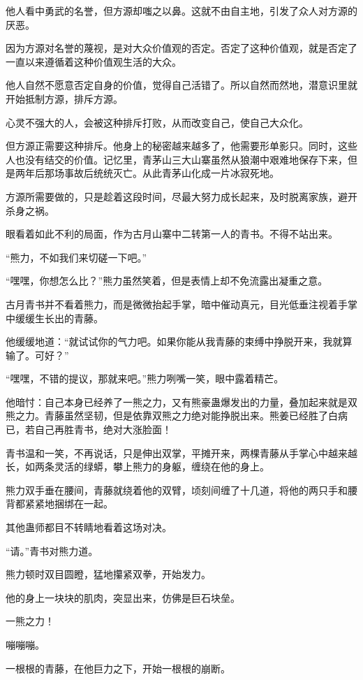 \begin{this_body}
他人看中勇武的名誉，但方源却嗤之以鼻。这就不由自主地，引发了众人对方源的厌恶。

因为方源对名誉的蔑视，是对大众价值观的否定。否定了这种价值观，就是否定了一直以来遵循着这种价值观生活的大众。

他人自然不愿意否定自身的价值，觉得自己活错了。所以自然而然地，潜意识里就开始抵制方源，排斥方源。

心灵不强大的人，会被这种排斥打败，从而改变自己，使自己大众化。

但方源正需要这种排斥。他身上的秘密越来越多了，他需要形单影只。同时，这些人也没有结交的价值。记忆里，青茅山三大山寨虽然从狼潮中艰难地保存下来，但是两年后那场事故后统统灭亡。从此青茅山化成一片冰寂死地。

方源所需要做的，只是趁着这段时间，尽最大努力成长起来，及时脱离家族，避开杀身之祸。

眼看着如此不利的局面，作为古月山寨中二转第一人的青书。不得不站出来。

“熊力，不如我们来切磋一下吧。”

“嘿嘿，你想怎么比？”熊力虽然笑着，但是表情上却不免流露出凝重之意。

古月青书并不看着熊力，而是微微抬起手掌，暗中催动真元，目光低垂注视着手掌中缓缓生长出的青藤。

他缓缓地道：“就试试你的气力吧。如果你能从我青藤的束缚中挣脱开来，我就算输了。可好？”

“嘿嘿，不错的提议，那就来吧。”熊力咧嘴一笑，眼中露着精芒。

他暗忖：自己本身已经养了一熊之力，又有熊豪蛊爆发出的力量，叠加起来就是双熊之力。青藤虽然坚韧，但是依靠双熊之力绝对能挣脱出来。熊姜已经胜了白病已，若自己再胜青书，绝对大涨脸面！

青书温和一笑，不再说话，只是伸出双掌，平摊开来，两棵青藤从手掌心中越来越长，如两条灵活的绿蟒，攀上熊力的身躯，缠绕在他的身上。

熊力双手垂在腰间，青藤就绕着他的双臂，顷刻间缠了十几道，将他的两只手和腰背都紧紧地捆绑在一起。

其他蛊师都目不转睛地看着这场对决。

“请。”青书对熊力道。

熊力顿时双目圆瞪，猛地攥紧双拳，开始发力。

他的身上一块块的肌肉，突显出来，仿佛是巨石块垒。

一熊之力！

嘣嘣嘣。

一根根的青藤，在他巨力之下，开始一根根的崩断。


\end{this_body}
